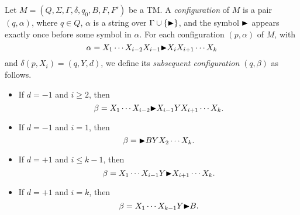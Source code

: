 \begin{definition}
  Let $M = (Q, \Sigma, \Gamma, \delta, q_0, B, F, F')$ be a TM.
  A \emph{configuration} of $M$ is a pair $(q, \alpha)$, where
  $q \in Q$, $\alpha$ is a string over $\Gamma \cup \{\mathord{\blacktriangleright}\}$, and the
  symbol $\mathord{\blacktriangleright}$ appears exactly once before some symbol in $\alpha$.
  For each configuration $(p, \alpha)$ of $M$, with
  \begin{equation*}
    \alpha = X_1 \cdots X_{i-2}X_{i-1} \mathord{\blacktriangleright} X_iX_{i+1} \cdots X_k
  \end{equation*}
  and $\delta(p, X_i) = (q, Y, d)$, we define its
  \emph{subsequent configuration} $(q, \beta)$ as follows.
  \begin{itemize}
    \item If $d = -1$ and $i \geq 2$, then
    \begin{equation*}
      \beta = X_1 \cdots X_{i-2} \mathord{\blacktriangleright} X_{i-1}YX_{i+1} \cdots X_k.
    \end{equation*}
    \item If $d = -1$ and $i = 1$, then
    \begin{equation*}
      \beta = \mathord{\blacktriangleright} BYX_2 \cdots X_k.
    \end{equation*}
    \item If $d = +1$ and $i \leq k - 1$, then
    \begin{equation*}
      \beta = X_1 \cdots X_{i-1}Y \mathord{\blacktriangleright} X_{i+1} \cdots X_k.
    \end{equation*}
    \item If $d = +1$ and $i = k$, then
    \begin{equation*}
      \beta = X_1 \cdots X_{k-1}Y \mathord{\blacktriangleright} B.
    \end{equation*}
  \end{itemize}
\end{definition}